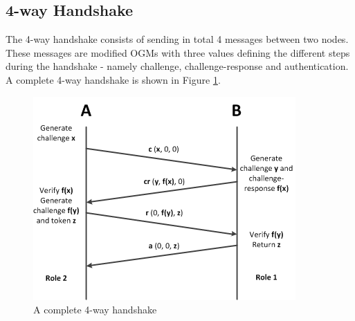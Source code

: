 \subsection{4-way Handshake}
\label{handshake}
The 4-way handshake consists of sending in total 4 messages between two nodes. These messages are modified OGMs with three values defining the different steps during the handshake - namely challenge, challenge-response and authentication. A complete 4-way handshake is shown in Figure \ref{fig:4way_handshake}. 

\begin{figure}[ht]
	\centering
		\includegraphics{images/4way_handshake.png}
	\caption{A complete 4-way handshake}
	\label{fig:4way_handshake}
\end{figure}

